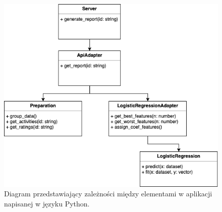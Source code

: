\documentclass[a4paper,twoside,12pt]{book}
\begin{document}
\begin{figure}[!htbp]
    \centering
    \includegraphics[width=\textwidth]{images/track_apps_ml.png}
    \caption{Diagram przedstawiający zależności między elementami w aplikacji napisanej w języku Python.}
    \label{fig:ml_uml}
\end{figure}
\end{document}

